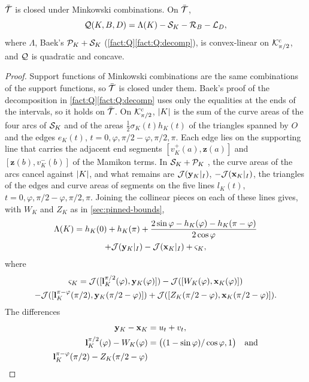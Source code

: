 \begin{lemma}[$\cQ$ on $\bar\cT$]\label{lem:stab-wide}
$\bar\cT$ is closed under Minkowski combinations. On $\bar\cT$,
\[
  \mathcal{Q}(K,B,D)=\Lambda(K)-\mathcal{S}_K-\mathcal{R}_B-\mathcal{L}_D,
\]
where $\Lambda$, Baek's $\mathcal{P}_K+\mathcal{S}_K$ (\cref{fact:Q}\ref{fact:Q:decomp}), is
convex-linear on $\mathcal{K}^{\mathrm{c}}_{\pi/2}$, and $\cQ$ is quadratic and concave.
\end{lemma}

\begin{proof}
Support functions of Minkowski combinations are the same combinations of the
support functions, so $\bar\cT$ is closed under them. Baek's proof of the
decomposition in \cref{fact:Q}\ref{fact:Q:decomp}  uses only
the equalities at the ends of the intervals, so it holds on $\bar\cT$. On
$\mathcal{K}^{\mathrm{c}}_{\pi/2}$, $\lvert K\rvert$ is the sum of the curve areas of the four arcs of
$\mathcal{S}_K$ and of the areas $\frac12\sigma_K(t)h_K(t)$ of the triangles spanned by
$O$ and the edges $e_K(t)$, $t=0,\varphi,\pi/2-\varphi,\pi/2,\pi$. Each edge
lies on the supporting line that carries the adjacent end segments
$[v_K^+(a),\mathbf z(a)]$ and $[\mathbf z(b),v_K^-(b)]$ of the Mamikon terms.
In $\mathcal{S}_K+\mathcal{P}_K$ , the curve areas of the arcs cancel against
$\lvert K\rvert$, and what remains are $\mathcal J(\mathbf{y}_K|_I)$, $-\mathcal J(\mathbf{x}_K|_I)$,
the triangles of the edges and curve areas of segments on the five lines
$l_K(t)$, $t=0,\varphi,\pi/2-\varphi,\pi/2,\pi$. Joining the collinear pieces
on each of these lines gives, with $W_K$ and $Z_K$ as in
\cref{sec:pinned-bounds},
\begin{multline*}
  \Lambda(K)=h_K(0)+h_K(\pi)
  +\frac{2\sin\varphi-h_K(\varphi)-h_K(\pi-\varphi)}{2\cos\varphi}\\
  +\mathcal J(\mathbf{y}_K|_I)-\mathcal J(\mathbf{x}_K|_I)+\varsigma_K ,
\end{multline*}
where
\begin{multline*}
  \varsigma_K=\mathcal J([\mathbf l^{\pi/2}_K(\varphi),\mathbf{y}_K(\varphi)])
    -\mathcal J([W_K(\varphi),\mathbf{x}_K(\varphi)])\\
  -\mathcal J([\mathbf l^{\pi-\varphi}_K(\pi/2),\mathbf{y}_K(\pi/2-\varphi)])
    +\mathcal J([Z_K(\pi/2-\varphi),\mathbf{x}_K(\pi/2-\varphi)]).
\end{multline*}
The differences
\begin{align*}
  \yy_K-\xx_K&=u_t+v_t,\\
  \mathbf l^{\pi/2}_K(\varphi)-W_K(\varphi)
    &=\bigl((1-\sin\varphi)/\cos\varphi,1\bigr)\quad\text{and}\\
  \mathbf l^{\pi-\varphi}_K(\pi/2)-Z_K(\pi/2-\varphi)

\end{align*}
\end{proof}
